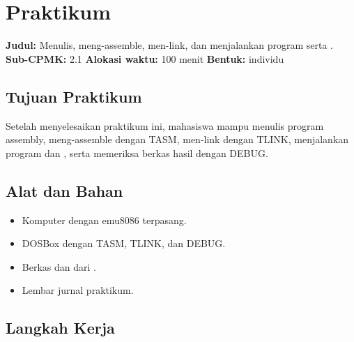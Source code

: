 \section{Praktikum}
\label{sec:praktikum-bab7}

\begin{praktikumbox}
\vspace{1.1em}
\textbf{Judul:} Menulis, meng-assemble, men-link, dan menjalankan
program  serta .\\[0.3em]
\textbf{Sub-CPMK:} 2.1 \quad\textbullet\quad
\textbf{Alokasi waktu:} 100 menit \quad\textbullet\quad
\textbf{Bentuk:} individu
\end{praktikumbox}

\subsection{Tujuan Praktikum}

Setelah menyelesaikan praktikum ini, mahasiswa mampu menulis program
assembly, meng-assemble dengan TASM, men-link dengan TLINK,
menjalankan program  dan , serta memeriksa
berkas hasil dengan DEBUG.

\subsection{Alat dan Bahan}

\begin{itemize}
    \item Komputer dengan emu8086 terpasang.
    \item DOSBox dengan TASM, TLINK, dan DEBUG.
    \item Berkas  dan  dari
          .
    \item Lembar jurnal praktikum.
\end{itemize}

\subsection{Langkah Kerja}

